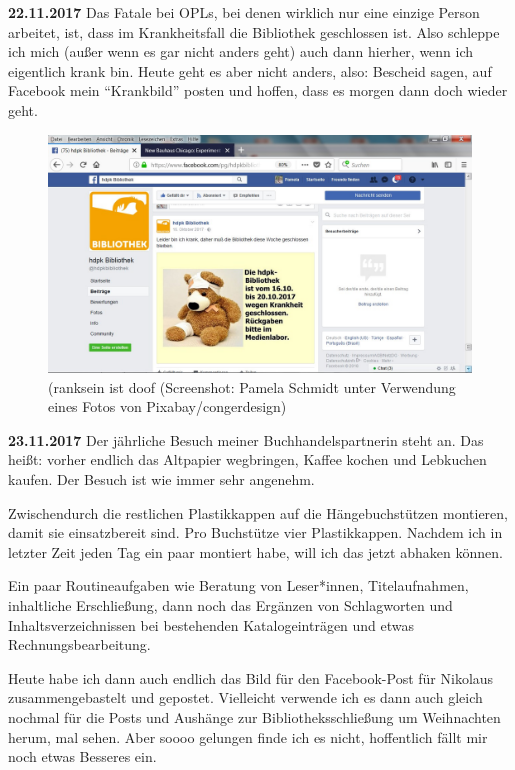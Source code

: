 \documentclass[a4paper,
fontsize=11pt,
oneside,
numbers=noperiodatend,
parskip=half-,
bibliography=totoc,
final
]{scrartcl}
\begin{document}
\textbf{22.11.2017} Das Fatale bei OPLs, bei denen wirklich nur eine
einzige Person arbeitet, ist, dass im Krankheitsfall die Bibliothek
geschlossen ist. Also schleppe ich mich (außer wenn es gar nicht anders
geht) auch dann hierher, wenn ich eigentlich krank bin. Heute geht es
aber nicht anders, also: Bescheid sagen, auf Facebook mein
\enquote{Krankbild} posten und hoffen, dass es morgen dann doch wieder
geht.

\begin{figure}
\centering
\includegraphics{img/Schmidt_2_b.jpg}
\caption{(ranksein ist doof (Screenshot: Pamela Schmidt unter Verwendung
eines Fotos von Pixabay/congerdesign)}
\end{figure}

\textbf{23.11.2017} Der jährliche Besuch meiner Buchhandelspartnerin
steht an. Das heißt: vorher endlich das Altpapier wegbringen, Kaffee
kochen und Lebkuchen kaufen. Der Besuch ist wie immer sehr angenehm.

Zwischendurch die restlichen Plastikkappen auf die Hängebuchstützen
montieren, damit sie einsatzbereit sind. Pro Buchstütze vier
Plastikkappen. Nachdem ich in letzter Zeit jeden Tag ein paar montiert
habe, will ich das jetzt abhaken können.

Ein paar Routineaufgaben wie Beratung von Leser*innen, Titelaufnahmen,
inhaltliche Erschließung, dann noch das Ergänzen von Schlagworten und
Inhaltsverzeichnissen bei bestehenden Katalogeinträgen und etwas
Rechnungsbearbeitung.

Heute habe ich dann auch endlich das Bild für den Facebook-Post für
Nikolaus zusammengebastelt und gepostet. Vielleicht verwende ich es dann
auch gleich nochmal für die Posts und Aushänge zur Bibliotheksschließung
um Weihnachten herum, mal sehen. Aber soooo gelungen finde ich es nicht,
hoffentlich fällt mir noch etwas Besseres ein.
\end{document}
